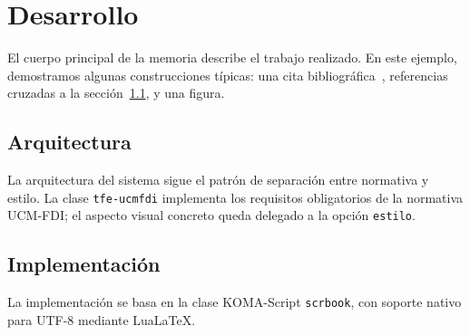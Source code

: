 \chapter{Desarrollo}

El cuerpo principal de la memoria describe el trabajo realizado.
En este ejemplo, demostramos algunas construcciones típicas: una
cita bibliográfica~\cite{knuth1986}, referencias cruzadas a la
sección~\ref{sec:arquitectura}, y una figura.

\section{Arquitectura}
\label{sec:arquitectura}

La arquitectura del sistema sigue el patrón de separación entre
normativa y estilo. La clase \texttt{tfe-ucmfdi} implementa los
requisitos obligatorios de la normativa UCM-FDI; el aspecto
visual concreto queda delegado a la opción \texttt{estilo}.

\section{Implementación}

La implementación se basa en la clase KOMA-Script
\texttt{scrbook}, con soporte nativo para UTF-8 mediante
LuaLaTeX.

\lipsum[4-8]
